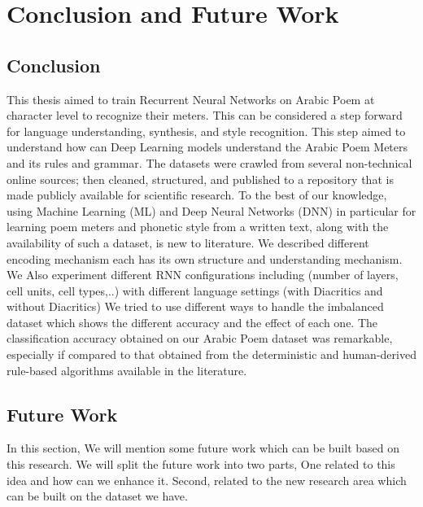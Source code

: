 \chapter{Conclusion and Future Work}\label{cha:concl-future-work}



\section{Conclusion}\label{sec:conclusion}

This thesis aimed to train Recurrent Neural Networks on Arabic Poem at character level to recognize their meters. This can be considered a step forward for language understanding, synthesis, and style recognition. This step aimed to understand how can Deep Learning models understand the Arabic Poem Meters and its rules and grammar. The datasets were crawled from several non-technical online sources; then cleaned, structured, and published to a repository that is made publicly available for scientific research. To the best of our knowledge, using Machine Learning (ML) and Deep Neural Networks (DNN) in particular for learning poem meters and phonetic style from a written text, along with the availability of such a dataset, is new to literature. We described different encoding mechanism each has its own structure and understanding mechanism. We Also experiment different RNN configurations including (number of layers, cell units, cell types,..) with different language settings (with Diacritics and without Diacritics) We tried to use different ways to handle the imbalanced dataset which shows the different accuracy and the effect of each one. The classification accuracy obtained on our Arabic Poem dataset was remarkable, especially if compared to that obtained from the deterministic and human-derived rule-based algorithms available in the literature.

\clearpage

\section{Future Work}

In this section, We will mention some future work which can be built based on this research. We will split the future work into two parts, One related to this idea and how can we enhance it. Second, related to the new research area which can be built on the dataset we have.

